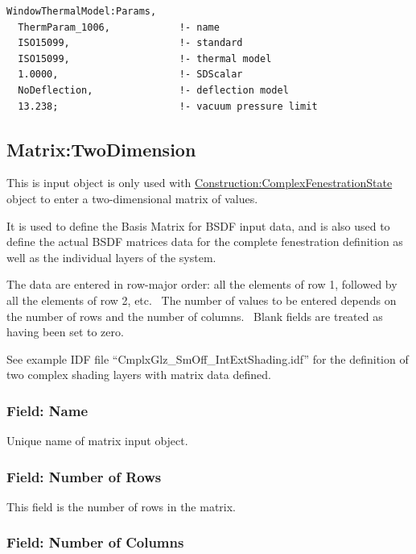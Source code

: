 \begin{lstlisting}
WindowThermalModel:Params,
  ThermParam_1006,            !- name
  ISO15099,                   !- standard
  ISO15099,                   !- thermal model
  1.0000,                     !- SDScalar
  NoDeflection,               !- deflection model
  13.238;                     !- vacuum pressure limit
\end{lstlisting}

\subsection{Matrix:TwoDimension}\label{matrixtwodimension}

This is input object is only used with \hyperref[constructioncomplexfenestrationstate]{Construction:ComplexFenestrationState} object to enter a two-dimensional matrix of values.

It is used to define the Basis Matrix for BSDF input data, and is also used to define the actual BSDF matrices data for the complete fenestration definition as well as the individual layers of the system.

The data are entered in row-major order: all the elements of row 1, followed by all the elements of row 2, etc.~ The number of values to be entered depends on the number of rows and the number of columns.~ Blank fields are treated as having been set to zero.

See example IDF file ``CmplxGlz\_{}SmOff\_{}IntExtShading.idf'' for the definition of two complex shading layers with matrix data defined.

\subsubsection{Field: Name}\label{field-name-34-000}

Unique name of matrix input object.

\subsubsection{Field: Number of Rows}\label{field-number-of-rows}

This field is the number of rows in the matrix.

\subsubsection{Field: Number of Columns}\label{field-number-of-columns}

